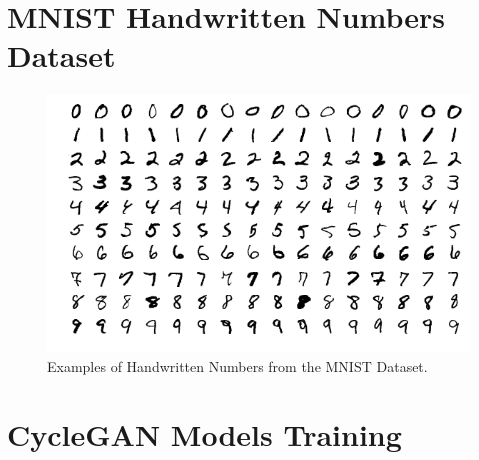 
\section{\ac{MNIST} Handwritten Numbers Dataset}
\begin{figure}[H]
        \begin{center}
	    \includegraphics[scale=0.40]{images/Appendix/handwrittenCrops.png}
	    \caption[Examples of Handwritten Numbers from the \ac{MNIST} Dataset.]{Examples of Handwritten Numbers from the \ac{MNIST} Dataset.\footnotemark}
	    \label{fig:handwrittenCrops}
	    \end{center}
\end{figure}




\section{\ac{CycleGAN} Models Training}


